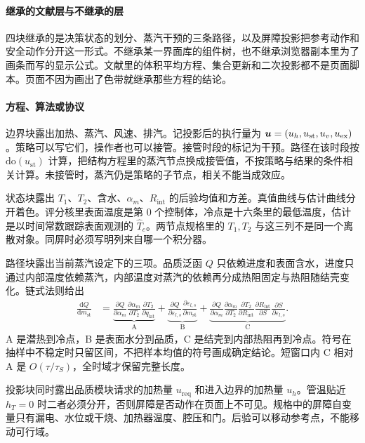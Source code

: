 \paragraph{继承的文献层与不继承的层}
四块继承的是决策状态的划分、蒸汽干预的三条路径，以及屏障投影把参考动作和安全动作分开这一形式。不继承某一界面库的组件树，也不继承浏览器副本里为了画条而写的显示公式。文献里的体积平均方程、集合更新和二次投影都不是页面脚本。页面不因为画出了色带就继承那些方程的结论。

\paragraph{方程、算法或协议}
边界块露出加热、蒸汽、风速、排汽。记投影后的执行量为 $\bm{u}=(u_h,u_{\mathrm{st}},u_v,u_{\mathrm{ex}})$。策略可以写它们，操作者也可以接管。接管时段的标记为干预。路径在该时段按 $\mathrm{do}(u_{\mathrm{st}})$ 计算，把结构方程里的蒸汽节点换成接管值，不按策略与结果的条件相关计算。未接管时，蒸汽仍是策略的子节点，相关不能当成效应。

状态块露出 $T_1$、$T_2$、含水、$\alpha_m$、$R_{\mathrm{int}}$ 的后验均值和方差。真值曲线与估计曲线分开着色。评分核里表面温度是第 0 个控制体，冷点是十六条里的最低温度，估计是以时间常数跟踪表面观测的 $\widehat T_c$。两节点规格里的 $T_1,T_2$ 与这三列不是同一个离散对象。同屏时必须写明列来自哪一个积分器。

路径块露出当前蒸汽设定下的三项。品质泛函 $Q$ 只依赖进度和表面含水，进度只通过内部温度依赖蒸汽，内部温度对蒸汽的依赖再分成热阻固定与热阻随结壳变化。链式法则给出
\begin{align*}
\frac{\mathrm{d}Q}{\mathrm{d}m_{\mathrm{st}}}
&=
\underbrace{\frac{\partial Q}{\partial\alpha_m}\frac{\partial\alpha_m}{\partial T_2}\frac{\partial T_2}{\partial q_{\mathrm{lat}}}}_{\mathrm{A}}
+
\underbrace{\frac{\partial Q}{\partial\varepsilon_{l,s}}\frac{\partial\varepsilon_{l,s}}{\partial m_{\mathrm{st}}}}_{\mathrm{B}}
+
\underbrace{\frac{\partial Q}{\partial\alpha_m}\frac{\partial\alpha_m}{\partial T_2}\frac{\partial T_2}{\partial R_{\mathrm{int}}}\frac{\partial R_{\mathrm{int}}}{\partial S}\frac{\partial S}{\partial\varepsilon_{l,s}}}_{\mathrm{C}}.
\end{align*}
A 是潜热到冷点，B 是表面水分到品质，C 是结壳到内部热阻再到冷点。符号在抽样中不稳定时只留区间，不把样本均值的符号画成确定结论。短窗口内 C 相对 A 是 $O(\tau/\tau_S)$，全时域才保留完整长度。

投影块同时露出品质模块请求的加热量 $u_{\mathrm{req}}$ 和进入边界的加热量 $u_h$。管温贴近 $h_T=0$ 时二者必须分开，否则屏障是否动作在页面上不可见。规格中的屏障自变量只有漏电、水位或干烧、加热器温度、腔压和门。后验可以移动参考点，不能移动可行域。

